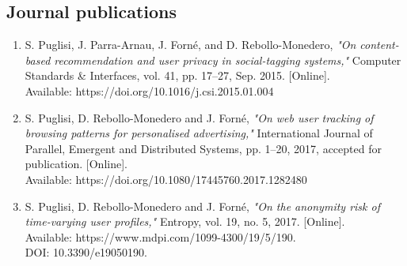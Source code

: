 \subsection{Journal publications}
\begin{enumerate}
    \item S. Puglisi, J. Parra-Arnau, J. Forn\'e, and D. Rebollo-Monedero, \emph{"On content-based recommendation and user privacy in social-tagging systems,"} Computer Standards \& Interfaces, vol. 41, pp. 17–27, Sep. 2015. [Online]. \\
    Available: https://doi.org/10.1016/j.csi.2015.01.004
          
    \item S. Puglisi, D. Rebollo-Monedero and J. Forn\'e, \emph{"On web user tracking of browsing patterns for personalised advertising,"} International Journal of Parallel, Emergent and Distributed Systems, pp. 1–20, 2017, accepted for publication. [Online]. \\
    Available: https://doi.org/10.1080/17445760.2017.1282480
    
    \item S. Puglisi, D. Rebollo-Monedero and J. Forn\'e, \emph{"On the anonymity risk of time-varying user profiles,"} Entropy, vol. 19, no. 5, 2017. [Online]. \\
    Available: https://www.mdpi.com/1099-4300/19/5/190. \\
    DOI: 10.3390/e19050190.
\end{enumerate}

